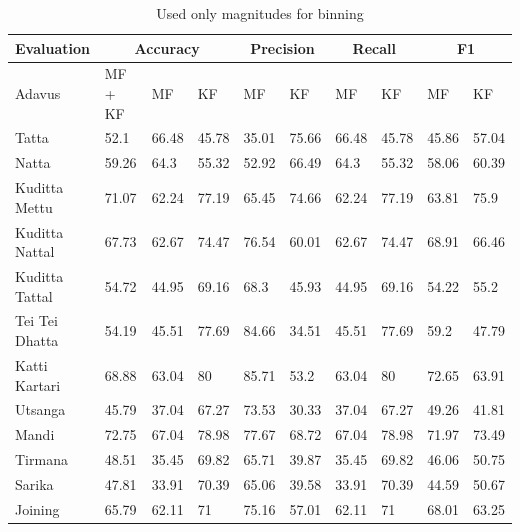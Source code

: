 \begin{table}[]
\centering
\hspace*{-2.5cm}
\begin{tabular}{|l|l|l|l|l|l|l|l|l|l|}
\hline
\textbf{Evaluation} &
  \multicolumn{3}{c|}{\textbf{Accuracy}} &
  \multicolumn{2}{c|}{\textbf{Precision}} &
  \multicolumn{2}{c|}{\textbf{Recall}} &
  \multicolumn{2}{c|}{\textbf{F1}} \\ \hline
Adavus         & MF + KF & MF    & KF    & MF    & KF    & MF    & KF    & MF    & KF    \\ \hline
Tatta          & 52.1    & 66.48 & 45.78 & 35.01 & 75.66 & 66.48 & 45.78 & 45.86 & 57.04 \\ \hline
Natta          & 59.26   & 64.3  & 55.32 & 52.92 & 66.49 & 64.3  & 55.32 & 58.06 & 60.39 \\ \hline
Kuditta Mettu  & 71.07   & 62.24 & 77.19 & 65.45 & 74.66 & 62.24 & 77.19 & 63.81 & 75.9  \\ \hline
Kuditta Nattal & 67.73   & 62.67 & 74.47 & 76.54 & 60.01 & 62.67 & 74.47 & 68.91 & 66.46 \\ \hline
Kuditta Tattal & 54.72   & 44.95 & 69.16 & 68.3  & 45.93 & 44.95 & 69.16 & 54.22 & 55.2  \\ \hline
Tei Tei Dhatta & 54.19   & 45.51 & 77.69 & 84.66 & 34.51 & 45.51 & 77.69 & 59.2  & 47.79 \\ \hline
Katti Kartari  & 68.88   & 63.04 & 80    & 85.71 & 53.2  & 63.04 & 80    & 72.65 & 63.91 \\ \hline
Utsanga        & 45.79   & 37.04 & 67.27 & 73.53 & 30.33 & 37.04 & 67.27 & 49.26 & 41.81 \\ \hline
Mandi          & 72.75   & 67.04 & 78.98 & 77.67 & 68.72 & 67.04 & 78.98 & 71.97 & 73.49 \\ \hline
Tirmana        & 48.51   & 35.45 & 69.82 & 65.71 & 39.87 & 35.45 & 69.82 & 46.06 & 50.75 \\ \hline
Sarika         & 47.81   & 33.91 & 70.39 & 65.06 & 39.58 & 33.91 & 70.39 & 44.59 & 50.67 \\ \hline
Joining        & 65.79   & 62.11 & 71    & 75.16 & 57.01 & 62.11 & 71    & 68.01 & 63.25 \\ \hline
\end{tabular}
\caption{Used only magnitudes for binning}
\label{tab:Ch06T001}
\end{table}


